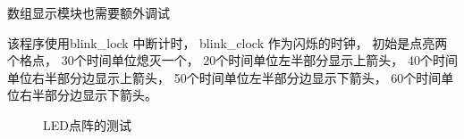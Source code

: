 \documentclass[../main.tex]{subfiles} %
\begin{document}
数组显示模块也需要额外调试



该程序使用blink\_lock 中断计时，
blink\_clock 作为闪烁的时钟，
初始是点亮两个格点，
30个时间单位熄灭一个，
20个时间单位左半部分显示上箭头，
40个时间单位右半部分边显示上箭头，
50个时间单位左半部分边显示下箭头，
60个时间单位右半部分边显示下箭头。

\begin{figure}[H]
  \centering
  \def\svgwidth{\linewidth}
  
  \caption{LED点阵的测试}
  \label{fig:test_array}
\end{figure}
\end{document}
